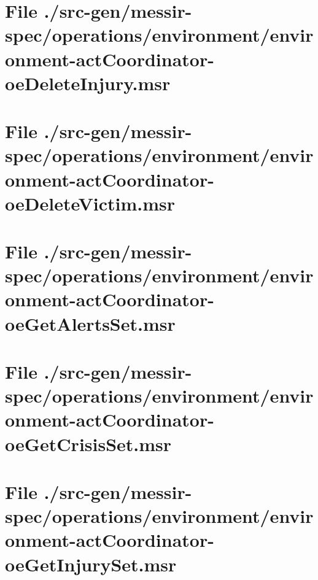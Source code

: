 \section[File /src-gen/messir-spec.../environment-actCoordinator-oeDeleteInjury.msr]{File ./src-gen/messir-spec/operations/environment/environment-actCoordinator-oeDeleteInjury.msr}
\scriptsize

\normalsize
	
\section[File /src-gen/messir-spec.../environment-actCoordinator-oeDeleteVictim.msr]{File ./src-gen/messir-spec/operations/environment/environment-actCoordinator-oeDeleteVictim.msr}
\scriptsize

\normalsize
	
\section[File /src-gen/messir-spec.../environment-actCoordinator-oeGetAlertsSet.msr]{File ./src-gen/messir-spec/operations/environment/environment-actCoordinator-oeGetAlertsSet.msr}
\scriptsize

\normalsize
	
\section[File /src-gen/messir-spec.../environment-actCoordinator-oeGetCrisisSet.msr]{File ./src-gen/messir-spec/operations/environment/environment-actCoordinator-oeGetCrisisSet.msr}
\scriptsize

\normalsize
	
\section[File /src-gen/messir-spec.../environment-actCoordinator-oeGetInjurySet.msr]{File ./src-gen/messir-spec/operations/environment/environment-actCoordinator-oeGetInjurySet.msr}
\scriptsize

\normalsize
	
